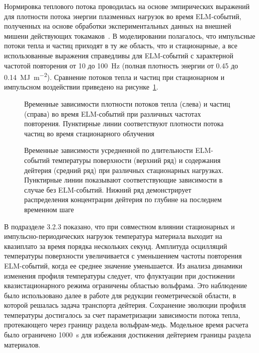 Нормировка теплового потока проводилась на основе эмпирических выражений для плотности потока энергии плазменных нагрузок во время ELM-событий, полученных на основе обработки экспериментальных данных на внешней мишени действующих токамаков~\cite{Eich2017,VandenKerkhof2021}. В моделировании полагалось, что импульсные потоки тепла и частиц приходят в ту же область, что и стационарные, а все использованные выражения справедливы для ELM-событий с характерной частотой повторения от 10 до \SI{100}{\hertz} (полная плотность энергии от \num{0.45} до \SI{0.14}{\mega\joule\per\meter\squared}). Сравнение потоков тепла и частиц при стационарном и импульсном воздействии приведено на рисунке~\cref{fig:ELM_fluxes}. 

\begin{figure}[ht]
	\caption{Временные зависимости плотности потоков тепла (слева) и частиц (справа) во время ELM-событий при различных частотах повторения. Пунктирные линии соответствуют плотности потока частиц во время стационарного облучения}\label{fig:ELM_fluxes}
\end{figure}

\begin{figure}[ht]
	\caption{Временные зависимости усредненной по длительности ELM-событий температуры поверхности (верхний ряд) и содержания дейтерия (средний ряд) при различных стационарных нагрузках. Пунктирные линии показывают соответствующие зависимости в случае без ELM-событий. Нижний ряд демонстрирует распределения концентрации дейтерия по глубине на последнем временном шаге}\label{fig:ELMs_frequency}
\end{figure}

В подразделе 3.2.3 показано, что при совместном влиянии стационарных и импульсно-периодических нагрузок температура материала выходит на квазиплато за время порядка нескольких секунд. Амплитуда осцилляций температуры поверхности увеличивается с уменьшением частоты повторения ELM-событий, когда ее среднее значение уменьшается. Из анализа динамики изменения профиля температуры следует, что флуктуации при достижении квазистационарного режима ограничены областью вольфрама. Это наблюдение было использовано далее в работе для редукции геометрической области, в которой решалась задача транспорта дейтерия. Сохранение эволюции профиля температуры достигалось за счет параметризации зависимости потока тепла, протекающего через границу раздела вольфрам-медь. Модельное время расчета было ограничено \SI{1000}{\second} для избежания достижения дейтерием границы раздела материалов.

